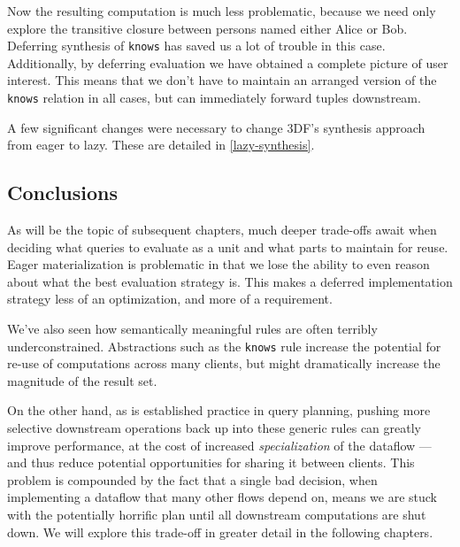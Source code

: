 \documentclass[../catalog.tex]{subfiles}
\begin{document}
Now the resulting computation is much less problematic, because we
need only explore the transitive closure between persons named either
Alice or Bob. Deferring synthesis of \texttt{knows} has saved us a lot
of trouble in this case. Additionally, by deferring evaluation we have
obtained a complete picture of user interest. This means that we don't
have to maintain an arranged version of the \texttt{knows} relation in
all cases, but can immediately forward tuples downstream.

A few significant changes were necessary to change 3DF's synthesis
approach from eager to lazy. These are detailed in
\ref{lazy-synthesis}.

\subsection{Conclusions}

As will be the topic of subsequent chapters, much deeper trade-offs
await when deciding what queries to evaluate as a unit and what parts
to maintain for reuse. Eager materialization is problematic in that we
lose the ability to even reason about what the best evaluation
strategy is. This makes a deferred implementation strategy less of an
optimization, and more of a requirement.

We've also seen how semantically meaningful rules are often terribly
underconstrained. Abstractions such as the \texttt{knows} rule
increase the potential for re-use of computations across many clients,
but might dramatically increase the magnitude of the result set.

On the other hand, as is established practice in query planning,
pushing more selective downstream operations back up into these
generic rules can greatly improve performance, at the cost of
increased \emph{specialization} of the dataflow — and thus reduce
potential opportunities for sharing it between clients. This problem
is compounded by the fact that a single bad decision, when
implementing a dataflow that many other flows depend on, means we are
stuck with the potentially horrific plan until all downstream
computations are shut down. We will explore this trade-off in greater
detail in the following chapters.
\end{document}
